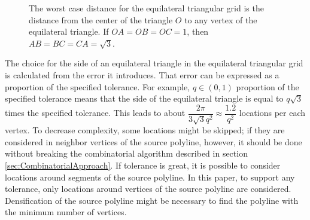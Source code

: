 \documentclass[conference]{IEEEtran}
\begin{document}
\begin{figure} [htb]
  \centering
  \caption
  {
    The worst case distance for the equilateral triangular grid is the distance from the center of the triangle $O$ to any vertex of the equilateral triangle. If $OA = OB = OC = 1$, then $AB = BC = CA = \sqrt{3}$.
  }
  \label{fig:TriangularGrid}
\end{figure}

The choice for the side of an equilateral triangle in the equilateral triangular grid is calculated from the error it introduces. That error can be expressed as a proportion of the specified tolerance. For example, $q \in \left( 0, 1 \right)$ proportion of the specified tolerance means that the side of the equilateral triangle is equal to $q \sqrt{3}$ times the specified tolerance. This leads to about $\dfrac{2 \pi}{3 \sqrt{3} q^2} \approx \dfrac{1.2}{q^2}$ locations per each vertex. To decrease complexity, some locations might be skipped; if they are considered in neighbor vertices of the source polyline, however, it should be done without breaking the combinatorial algorithm described in section \ref{sec:CombinatorialApproach}. If tolerance is great, it is possible to consider locations around segments of the source polyline. In this paper, to support any tolerance, only locations around vertices of the source polyline are considered. Densification of the source polyline might be necessary to find the polyline with the minimum number of vertices.
\end{document}
